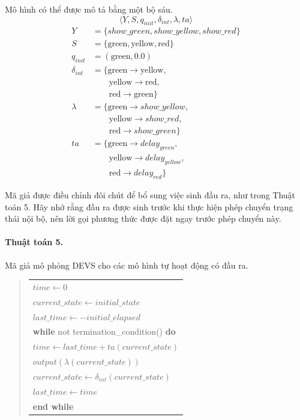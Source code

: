 Mô hình có thể được mô tả bằng một bộ sáu.
\[
\langle Y,S,q_{init},\delta_{int},\lambda,ta\rangle
\]
\begin{align*}
Y &= \{show\_green,show\_yellow,show\_red\}\\
S &= \{\mathrm{green},\mathrm{yellow},\mathrm{red}\}\\
q_{init} &= (\mathrm{green},0.0)\\
\delta_{int} &= \{\mathrm{green}\rightarrow\mathrm{yellow},\\
&\qquad\mathrm{yellow}\rightarrow\mathrm{red},\\
&\qquad\mathrm{red}\rightarrow\mathrm{green}\}\\
\lambda &= \{\mathrm{green}\rightarrow show\_yellow,\\
&\qquad\mathrm{yellow}\rightarrow show\_red,\\
&\qquad\mathrm{red}\rightarrow show\_green\}\\
ta &= \{\mathrm{green}\rightarrow delay_{green},\\
&\qquad\mathrm{yellow}\rightarrow delay_{yellow},\\
&\qquad\mathrm{red}\rightarrow delay_{red}\}
\end{align*}

Mã giả được điều chỉnh đôi chút để bổ sung việc sinh đầu ra, như trong Thuật toán 5. Hãy nhớ rằng đầu ra được sinh trước khi thực hiện phép chuyển trạng thái nội bộ, nên lời gọi phương thức được đặt ngay trước phép chuyển này.

\begin{samepage}
\paragraph{Thuật toán 5.} Mã giả mô phỏng DEVS cho các mô hình tự hoạt động có đầu ra.
\begin{quote}
\begin{tabular}{l}
$time\leftarrow 0$\\
$current\_state\leftarrow initial\_state$\\
$last\_time\leftarrow -initial\_elapsed$\\
\textbf{while} not termination\_condition() \textbf{do}\\
\quad $time\leftarrow last\_time+ta(current\_state)$\\
\quad $output(\lambda(current\_state))$\\
\quad $current\_state\leftarrow\delta_{int}(current\_state)$\\
\quad $last\_time\leftarrow time$\\
\textbf{end while}
\end{tabular}
\end{quote}
\end{samepage}

